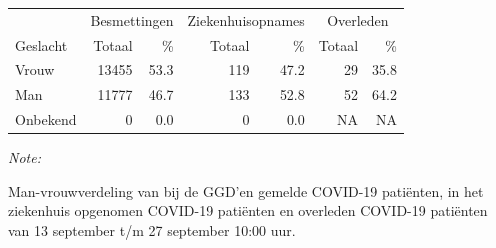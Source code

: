 \documentclass[
  english,
  man,floatsintext]{apa6}
\begin{document}
\begin{table}
\centering\begingroup\fontsize{11}{13}\selectfont

\begin{threeparttable}
\begin{tabular}{lrrrrrr}
\toprule
\multicolumn{1}{c}{ } & \multicolumn{2}{c}{Besmettingen} & \multicolumn{2}{c}{Ziekenhuisopnames} & \multicolumn{2}{c}{Overleden} \\
\cmidrule(l{3pt}r{3pt}){2-3} \cmidrule(l{3pt}r{3pt}){4-5} \cmidrule(l{3pt}r{3pt}){6-7}
Geslacht & Totaal & \% & Totaal & \% & Totaal & \%\\
\midrule
Vrouw & 13455 & 53.3 & 119 & 47.2 & 29 & 35.8\\
Man & 11777 & 46.7 & 133 & 52.8 & 52 & 64.2\\
Onbekend & 0 & 0.0 & 0 & 0.0 & NA & NA\\
\bottomrule
\end{tabular}
\begin{tablenotes}
\item \textit{Note: } 
\item Man-vrouwverdeling van bij de GGD’en gemelde COVID-19 patiënten, in het ziekenhuis opgenomen COVID-19 patiënten en overleden COVID-19 patiënten van 13 september t/m 27 september 10:00 uur.
\end{tablenotes}
\end{threeparttable}
\endgroup{}
\end{table}
\newpage
\end{document}
